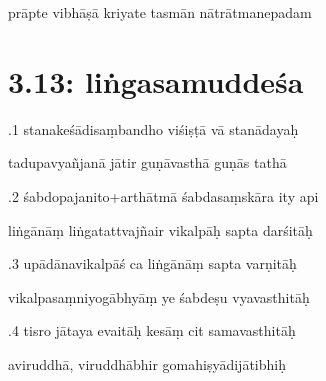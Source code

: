 \documentclass[article,12pt,a4paper]{memoir}%
\newcounter{parCount}
\begin{document}
	  
	  \pstart \leavevmode%
	prāpte vibhāṣā kriyate tasmān nātrātmanepadam 
	{}
	\pend%
      
	  
	
\chapter[{3.13: liṅgasamuddeśa}][{3.13: liṅgasamuddeśa}]{ 3.13: liṅgasamuddeśa}

	  
	  \pstart {}.1 stanakeśādisaṃbandho viśiṣṭā vā stanādayaḥ 
	{}
	\pend%
      

	  
	  \pstart \leavevmode%
	tadupavyañjanā jātir guṇāvasthā guṇās tathā 
	{}
	\pend%
      

	  
	  \pstart {}.2 śabdopajanito+arthātmā śabdasaṃskāra ity api 
	{}
	\pend%
      

	  
	  \pstart \leavevmode%
	liṅgānāṃ liṅgatattvajñair vikalpāḥ sapta darśitāḥ 
	{}
	\pend%
      

	  
	  \pstart {}.3 upādānavikalpāś ca liṅgānāṃ sapta varṇitāḥ 
	{}
	\pend%
      

	  
	  \pstart \leavevmode%
	vikalpasaṃniyogābhyāṃ ye śabdeṣu vyavasthitāḥ 
	{}
	\pend%
      

	  
	  \pstart {}.4 tisro jātaya evaitāḥ kesāṃ cit samavasthitāḥ 
	{}
	\pend%
      

	  
	  \pstart \leavevmode%
	aviruddhā, viruddhābhir gomahiṣyādijātibhiḥ 
	{}
	\pend%
      
\end{document}
